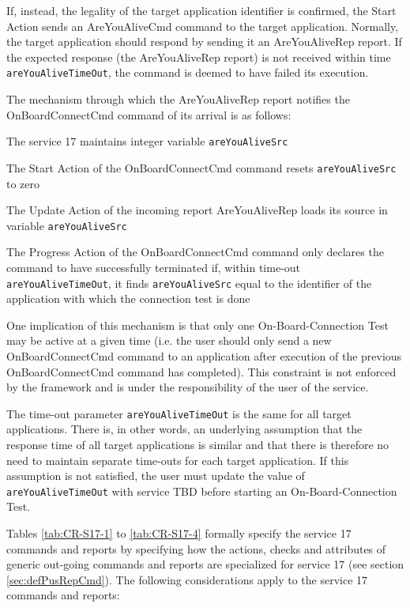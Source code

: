 \documentclass{pnp_article}
\begin{document}
If, instead, the legality of the target application identifier is confirmed, the Start Action sends an AreYouAliveCmd command to the target application. Normally, the target application should respond by sending it an AreYouAliveRep report. If the expected response (the AreYouAliveRep report) is not received within time \texttt{areYouAliveTimeOut}, the command is deemed to have failed its execution.

The mechanism through which the AreYouAliveRep report notifies the OnBoardConnectCmd command of its arrival is as follows:

\begin{fw_itemize}
\item The service 17 maintains integer variable \texttt{areYouAliveSrc}
\item The Start Action of the OnBoardConnectCmd command resets \texttt{areYouAliveSrc} to zero
\item The Update Action of the incoming report AreYouAliveRep loads its source in variable \texttt{areYouAliveSrc}
\item The Progress Action of the OnBoardConnectCmd command only declares the command to have successfully terminated if, within time-out \texttt{areYouAliveTimeOut}, it finds \texttt{areYouAliveSrc} equal to the identifier of the application with which the connection test is done
\end{fw_itemize}

One implication of this mechanism is that only one On-Board-Connection Test may be active at a given time (i.e. the user should only send a new OnBoardConnectCmd command to an application after execution of the previous OnBoardConnectCmd command has completed). This constraint is not enforced by the framework and is under the responsibility of the user of the service.

The time-out parameter \texttt{areYouAliveTimeOut} is the same for all target applications. There is, in other words, an underlying assumption that the response time of all target applications is similar and that there is therefore no need to maintain separate time-outs for each target application. If this assumption is not satisfied, the user must update the value of \texttt{areYouAliveTimeOut} with service TBD before starting an On-Board-Connection Test.

Tables \ref{tab:CR-S17-1} to \ref{tab:CR-S17-4} formally specify the service 17 commands and reports by specifying how the actions, checks and attributes of generic out-going commands and reports are specialized for service 17 (see section \ref{sec:defPusRepCmd}). The following considerations apply to the service 17 commands and reports:
\end{document}

